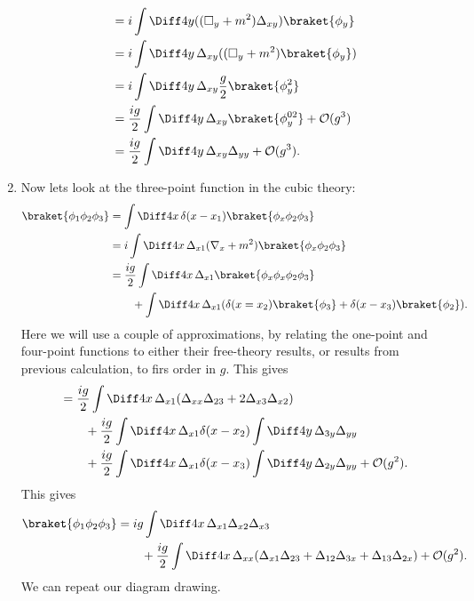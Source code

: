 \documentclass[12pt]{article}
\begin{document}
\begin{exbox}
\begin{enumerate}
\begin{align*}
						&= i \int \Diff 4 y ((\square_y + m^2) \Delta_{xy}) \braket{\phi_y} \\
						&= i \int \Diff 4 y \, \Delta_{xy}((\square_y + m^2) \braket{\phi_y}) \\
						&= i \int \Diff 4 y \, \Delta_{xy} \frac{g}{2} \braket{\phi_y^2} \\
						&= \frac{ig}{2} \int \Diff 4 y \, \Delta_{xy} \braket{\phi_y^{02}} + \mathcal{O}(g^3) \\
						&= \frac{ig}{2} \int \Diff 4 y \, \Delta_{xy} \Delta_{yy} + \mathcal{O}(g^3).
			\end{align*}
		\item Now lets look at the three-point function in the cubic theory:
			\begin{align*}
				\braket{\phi_1 \phi_2 \phi_3} &= \int \Diff 4 x \, \delta(x - x_1) \braket{\phi_x \phi_2 \phi_3} \\
							      &= i \int \Diff 4 x \, \Delta_{x1} (\nabla_x + m^2) \braket{\phi_x \phi_2 \phi_3} \\
							      &= \frac{ig}{2} \int \Diff 4 x \, \Delta_{x1} \braket{\phi_x \phi_x \phi_2 \phi_3} \\
							      & \qquad + \int \Diff 4 x \, \Delta_{x1} (\delta(x = x_2) \braket{\phi_3} + \delta(x - x_3) \braket{\phi_2}).
			\end{align*}
			Here we will use a couple of approximations, by relating the one-point and four-point functions to either their free-theory results, or results from previous calculation, to firs order in $g$. This gives
			\begin{align*}
				&= \frac{ig}{2} \int \Diff 4 x\, \Delta_{x1}(\Delta_{xx} \Delta_{23} + 2 \Delta_{x3} \Delta_{x2}) \\
				& \qquad+ \frac{ig}{2} \int \Diff 4 x \, \Delta_{x1} \delta(x - x_2) \int \Diff 4 y \, \Delta_{3y} \Delta_{yy} \\
				&\qquad + \frac{ig}{2} \int \Diff 4 x \, \Delta_{x1} \delta(x - x_3) \int \Diff 4 y \, \Delta_{2y} \Delta_{yy} + \mathcal{O}(g^2).
			\end{align*}
			This gives
			\begin{align*}
				\braket{\phi_1 \phi_2 \phi_3} &= ig \int \Diff4 x\, \Delta_{x1} \Delta_{x2} \Delta_{x3} \\
				&\qquad + \frac{ig}{2} \int \Diff 4 x \, \Delta_{xx} (\Delta_{x1} \Delta_{23} + \Delta_{12} \Delta_{3x} + \Delta_{13} \Delta_{2x}) + \mathcal{O}(g^2).
			\end{align*}
			We can repeat our diagram drawing.

\end{enumerate}
\end{exbox}
\end{document}
